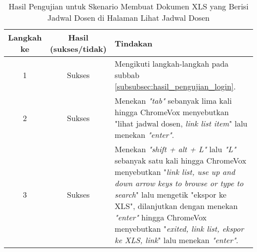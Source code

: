 \begin{table}[H]
    \centering 
    \caption{Hasil Pengujian untuk Skenario Membuat Dokumen XLS yang Berisi Jadwal Dosen di Halaman Lihat Jadwal Dosen}
    \label{tab:hasil_pengujian_membuat_dokumen_xls_yang_berisi_jadwal_dosen_di_halaman_lihat_jadwal_dosen}
    \begin{tabular}{|c|c|p{10cm}|}
        \toprule
        Langkah ke & Hasil (sukses/tidak) & Tindakan \\

        \midrule
        1 & Sukses & Mengikuti langkah-langkah pada subbab \ref{subsubsec:hasil_pengujian_login}. \\
        2 & Sukses & Menekan \textit{"tab"} sebanyak lima kali hingga ChromeVox menyebutkan "lihat jadwal dosen, \textit{link list item}" lalu menekan \textit{"enter"}. \\
        3 & Sukses & Menekan \textit{"shift + alt + L"} lalu \textit{"L"} sebanyak satu kali hingga ChromeVox menyebutkan "\textit{link list, use up and down arrow keys to browse or type to search}" lalu mengetik "ekspor ke XLS", dilanjutkan dengan menekan \textit{"enter"} hingga ChromeVox menyebutkan "\textit{exited, link list, ekspor ke XLS, link}" lalu menekan \textit{"enter"}. \\

        \bottomrule

    \end{tabular}
\end{table}